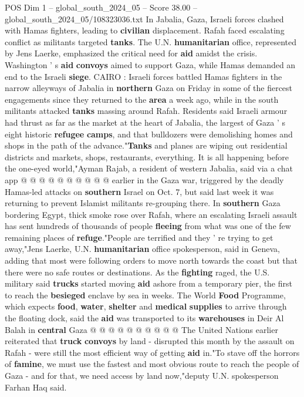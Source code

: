 \begin{textsample}{POS Dim 1 – global\_south\_2024\_05 – Score 38.00 – global\_south\_2024\_05/108323036.txt}  \label{ex:f1_pos_071}
In Jabalia, Gaza, Israeli forces clashed with Hamas fighters, leading to \textbf{civilian} displacement.
Rafah faced escalating conflict as militants targeted \textbf{tanks}.
The U.N. \textbf{humanitarian} office, represented by Jens Laerke, emphasized the critical need for \textbf{aid} amidst the crisis.
Washington ' s \textbf{aid} \textbf{convoys} aimed to support Gaza, while Hamas demanded an end to the Israeli \textbf{siege}.
CAIRO : Israeli forces battled Hamas fighters in the narrow alleyways of Jabalia in \textbf{northern} Gaza on Friday in some of the fiercest engagements since they returned to the \textbf{area} a week ago, while in the south militants attacked \textbf{tanks} massing around Rafah.
Residents said Israeli armour had thrust as far as the market at the heart of Jabalia, the largest of Gaza ' s eight historic \textbf{refugee} \textbf{camps}, and that bulldozers were demolishing homes and shops in the path of the advance."\textbf{Tanks} and planes are wiping out residential districts and markets, shops, restaurants, everything.
It is all happening before the one-eyed world,"Ayman Rajab, a resident of western Jabalia, said via a chat app @ @ @ @ @ @ @ @ @ @ earlier in the Gaza war, triggered by the deadly Hamas-led attacks on \textbf{southern} Israel on Oct. 7, but said last week it was returning to prevent Islamist militants re-grouping there.
In \textbf{southern} Gaza bordering Egypt, thick smoke rose over Rafah, where an escalating Israeli assault has sent hundreds of thousands of people \textbf{fleeing} from what was one of the few remaining places of \textbf{refuge}."People are terrified and they ' re trying to get away,"Jens Laerke, U.N. \textbf{humanitarian} office spokesperson, said in Geneva, adding that most were following orders to move north towards the coast but that there were no safe routes or destinations.
As the \textbf{fighting} raged, the U.S. military said \textbf{trucks} started moving \textbf{aid} ashore from a temporary pier, the first to reach the \textbf{besieged} enclave by sea in weeks.
The World \textbf{Food} Programme, which expects \textbf{food}, \textbf{water}, \textbf{shelter} and \textbf{medical} \textbf{supplies} to arrive through the floating dock, said the \textbf{aid} was transported to its \textbf{warehouses} in Deir Al Balah in \textbf{central} Gaza @ @ @ @ @ @ @ @ @ @ The United Nations earlier reiterated that \textbf{truck} \textbf{convoys} by land - disrupted this month by the assault on Rafah - were still the most efficient way of getting \textbf{aid} in."To stave off the horrors of \textbf{famine}, we must use the fastest and most obvious route to reach the people of Gaza - and for that, we need access by land now,"deputy U.N. spokesperson Farhan Haq said.

\end{textsample}

